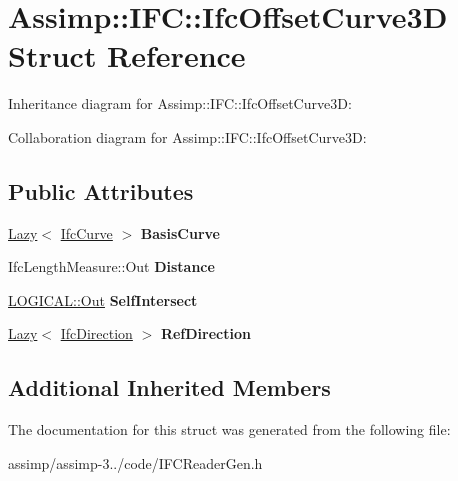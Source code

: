 \hypertarget{struct_assimp_1_1_i_f_c_1_1_ifc_offset_curve3_d}{\section{Assimp\+:\+:I\+F\+C\+:\+:Ifc\+Offset\+Curve3\+D Struct Reference}
\label{struct_assimp_1_1_i_f_c_1_1_ifc_offset_curve3_d}
}


Inheritance diagram for Assimp\+:\+:I\+F\+C\+:\+:Ifc\+Offset\+Curve3\+D\+:


Collaboration diagram for Assimp\+:\+:I\+F\+C\+:\+:Ifc\+Offset\+Curve3\+D\+:
\subsection*{Public Attributes}
\begin{DoxyCompactItemize}
\item 
\hypertarget{struct_assimp_1_1_i_f_c_1_1_ifc_offset_curve3_d_a67ff5651ab0a74ff08a7e7d09e7f9645}{\hyperlink{struct_assimp_1_1_s_t_e_p_1_1_lazy}{Lazy}$<$ \hyperlink{struct_assimp_1_1_i_f_c_1_1_ifc_curve}{Ifc\+Curve} $>$ {\bfseries Basis\+Curve}}\label{struct_assimp_1_1_i_f_c_1_1_ifc_offset_curve3_d_a67ff5651ab0a74ff08a7e7d09e7f9645}

\item 
\hypertarget{struct_assimp_1_1_i_f_c_1_1_ifc_offset_curve3_d_a5b7c69ae8c09109ee7561e22266dfc78}{Ifc\+Length\+Measure\+::\+Out {\bfseries Distance}}\label{struct_assimp_1_1_i_f_c_1_1_ifc_offset_curve3_d_a5b7c69ae8c09109ee7561e22266dfc78}

\item 
\hypertarget{struct_assimp_1_1_i_f_c_1_1_ifc_offset_curve3_d_aa2e0cb4822037c7ea7189145bb0e2e89}{\hyperlink{classboost_1_1shared__ptr}{L\+O\+G\+I\+C\+A\+L\+::\+Out} {\bfseries Self\+Intersect}}\label{struct_assimp_1_1_i_f_c_1_1_ifc_offset_curve3_d_aa2e0cb4822037c7ea7189145bb0e2e89}

\item 
\hypertarget{struct_assimp_1_1_i_f_c_1_1_ifc_offset_curve3_d_a9a51dc41628fe8cae19b4e060e329e2d}{\hyperlink{struct_assimp_1_1_s_t_e_p_1_1_lazy}{Lazy}$<$ \hyperlink{struct_assimp_1_1_i_f_c_1_1_ifc_direction}{Ifc\+Direction} $>$ {\bfseries Ref\+Direction}}\label{struct_assimp_1_1_i_f_c_1_1_ifc_offset_curve3_d_a9a51dc41628fe8cae19b4e060e329e2d}

\end{DoxyCompactItemize}
\subsection*{Additional Inherited Members}


The documentation for this struct was generated from the following file\+:\begin{DoxyCompactItemize}
\item 
assimp/assimp-\/3../code/I\+F\+C\+Reader\+Gen.\+h\end{DoxyCompactItemize}

